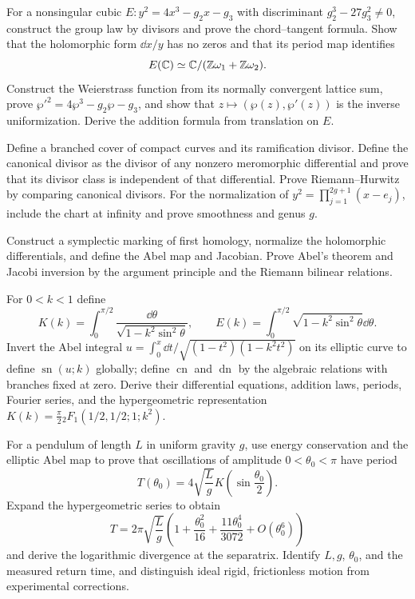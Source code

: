 \begin{exercise}
For a nonsingular cubic
$E:y^2=4x^3-g_2x-g_3$ with discriminant $g_2^3-27g_3^2\ne0$, construct the
group law by divisors and prove the chord--tangent formula.  Show that the
holomorphic form $\dd x/y$ has no zeros and that its period map identifies
\[
 E(\mathbb C)\simeq\mathbb C/(\mathbb Z\omega_1+\mathbb Z\omega_2).
\]
Construct the Weierstrass function from its normally convergent lattice sum,
prove $\wp'^2=4\wp^3-g_2\wp-g_3$, and show that $z\mapsto(\wp(z),\wp'(z))$
is the inverse uniformization.  Derive the addition formula from translation
on $E$.
\end{exercise}

\begin{exercise}
Define a branched cover of compact curves and its ramification divisor.
Define the canonical divisor as the divisor of any nonzero meromorphic
differential and prove that its divisor class is independent of that
differential.  Prove Riemann--Hurwitz by comparing canonical divisors.  For the normalization
of $y^2=\prod_{j=1}^{2g+1}(x-e_j)$, include the chart at infinity and prove
smoothness and genus $g$.
\end{exercise}

\begin{exercise}
Construct a symplectic marking of first homology,
normalize the holomorphic differentials, and define the Abel map and Jacobian.
Prove Abel's theorem and Jacobi inversion by the argument principle and the
Riemann bilinear relations.
\end{exercise}

\begin{exercise}
For $0<k<1$ define
\[
 K(k)=\int_0^{\pi/2}\frac{\dd\theta}
 {\sqrt{1-k^2\sin^2\theta}},\qquad
 E(k)=\int_0^{\pi/2}\sqrt{1-k^2\sin^2\theta}\dd\theta.
\]
Invert the Abel integral
$u=\int_0^x\dd t/\sqrt{(1-t^2)(1-k^2t^2)}$ on its elliptic curve to define
$\operatorname{sn}(u;k)$ globally; define $\operatorname{cn}$ and
$\operatorname{dn}$ by the algebraic relations with branches fixed at zero.
Derive their differential equations, addition laws, periods, Fourier series,
and the hypergeometric representation
$K(k)=\frac\pi2{}_2F_1(1/2,1/2;1;k^2)$.
\end{exercise}

\begin{exercise}
For a pendulum of length $L$ in uniform gravity $g$, use energy conservation
and the elliptic Abel map to prove that oscillations of amplitude
$0<\theta_0<\pi$ have period
\[
 T(\theta_0)=4\sqrt{\frac Lg}
 K\!\left(\sin\frac{\theta_0}{2}\right).
\]
Expand the hypergeometric series to obtain
\[
 T=2\pi\sqrt{\frac Lg}
 \left(1+\frac{\theta_0^2}{16}
 +\frac{11\theta_0^4}{3072}+O(\theta_0^6)\right)
\]
and derive the logarithmic divergence at the separatrix.  Identify $L,g$,
$\theta_0$, and the measured return time, and distinguish ideal rigid,
frictionless motion from experimental corrections.
\end{exercise}

